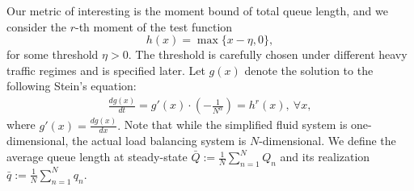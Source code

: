 \documentclass[11pt,oneside,letter]{article}
\begin{document}
Our metric of interesting  is the moment bound of total queue length, and we consider the $r$-th moment of the test function $$h(x) = \max\{x - \eta, 0\},$$ for some threshold $\eta > 0.$ The threshold is carefully chosen under different heavy traffic regimes and is specified later. 
Let $g(x)$ denote the solution to the following Stein's equation:
\begin{align}
\frac{dg(x)}{dt} = g'(x) \cdot \left(-\frac{1}{N^{\alpha}}\right) = h^r(x), ~ \forall x, \label{Gen:L}
\end{align}
where $g'(x) = \frac{dg(x)}{dx}.$ 
Note that while the simplified fluid system is one-dimensional, the actual load balancing system is $N$-dimensional. We define the average queue length at steady-state $\bar{Q} := \frac{1}{N} \sum_{n=1}^{N} Q_n$ and its realization  
$\bar{q} := \frac{1}{N} \sum_{n=1}^{N} q_n.$
\end{document}
